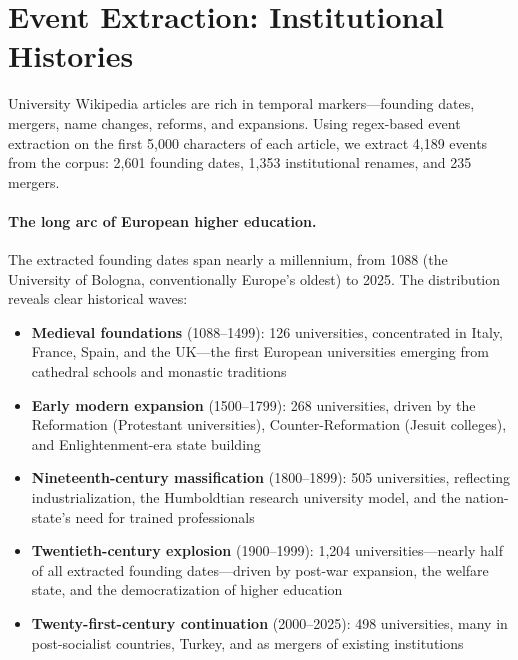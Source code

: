 \documentclass[../main.tex]{subfiles}
\begin{document}
\section*{Event Extraction: Institutional Histories}

University Wikipedia articles are rich in temporal markers---founding dates,
mergers, name changes, reforms, and expansions. Using regex-based event
extraction on the first 5,000 characters of each article, we extract
4,189 events from the corpus: 2,601 founding dates, 1,353 institutional
renames, and 235 mergers.

\paragraph{The long arc of European higher education.}
The extracted founding dates span nearly a millennium, from 1088 (the
University of Bologna, conventionally Europe's oldest) to 2025. The
distribution reveals clear historical waves:

\begin{itemize}
    \item \textbf{Medieval foundations} (1088--1499): 126 universities,
    concentrated in Italy, France, Spain, and the UK---the first European
    universities emerging from cathedral schools and monastic traditions
    \item \textbf{Early modern expansion} (1500--1799): 268 universities,
    driven by the Reformation (Protestant universities), Counter-Reformation
    (Jesuit colleges), and Enlightenment-era state building
    \item \textbf{Nineteenth-century massification} (1800--1899): 505
    universities, reflecting industrialization, the Humboldtian research
    university model, and the nation-state's need for trained professionals
    \item \textbf{Twentieth-century explosion} (1900--1999): 1,204
    universities---nearly half of all extracted founding dates---driven by
    post-war expansion, the welfare state, and the democratization of
    higher education
    \item \textbf{Twenty-first-century continuation} (2000--2025): 498
    universities, many in post-socialist countries, Turkey, and as mergers
    of existing institutions
\end{itemize}
\end{document}
